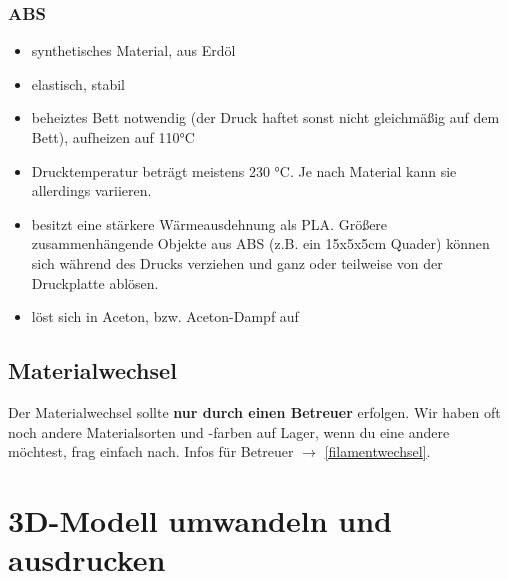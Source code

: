 \documentclass{\basedir/fablab-document}
\begin{document}
\subsubsection{ABS}
\begin{itemize}
 \item synthetisches Material, aus Erdöl
 \item elastisch, stabil
 \item beheiztes Bett notwendig (der Druck haftet sonst nicht gleichmäßig auf dem Bett), aufheizen auf 110°C
 \item Drucktemperatur beträgt meistens 230 °C. Je nach Material kann sie allerdings variieren.
 \item besitzt eine stärkere Wärmeausdehnung als PLA. Größere zusammenhängende Objekte aus ABS (z.B. ein 15x5x5cm Quader) können sich während des Drucks verziehen und ganz oder teilweise von der Druckplatte ablösen.
 \item löst sich in Aceton, bzw. Aceton-Dampf auf
\end{itemize}

\subsection{Materialwechsel}
Der Materialwechsel sollte \textbf{nur durch einen Betreuer} erfolgen.
Wir haben oft noch andere Materialsorten und -farben auf Lager,
wenn du eine andere möchtest, frag einfach nach. Infos für Betreuer $\to$ \ref{filamentwechsel}.

\pagebreak

\section{3D-Modell umwandeln und ausdrucken}
\end{document}
